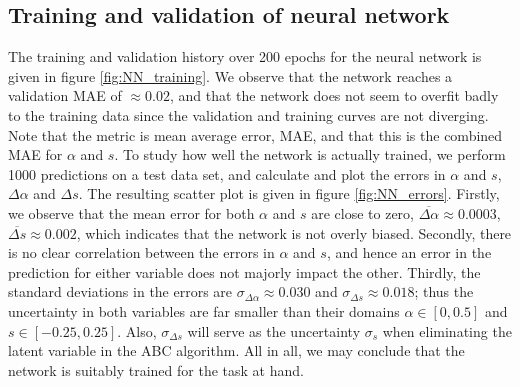 \documentclass[11pt,a4paper]{article}
\begin{document}

\subsection{Training and validation of neural network}\label{sec:validate_NN}

The training and validation history over 200 epochs for the neural network is given in figure \ref{fig:NN_training}. We observe that the network reaches a validation MAE of $\approx 0.02$, and that the network does not seem to overfit badly to the training data since the validation and training curves are not diverging. Note that the metric is mean average error, MAE, and that this is the combined MAE for $\alpha$ and $s$. To study how well the network is actually trained, we perform 1000 predictions on a test data set, and calculate and plot the errors in $\alpha$ and $s$, $\Delta \alpha$ and $\Delta s$. The resulting scatter plot is given in figure \ref{fig:NN_errors}. Firstly, we observe that the mean error for both $\alpha$ and $s$ are close to zero, $\overline{\Delta \alpha} \approx 0.0003$, $\overline{\Delta s} \approx 0.002$, which indicates that the network is not overly biased. Secondly, there is no clear correlation between the errors in $\alpha$ and $s$, and hence an error in the prediction for either variable does not majorly impact the other. Thirdly, the standard deviations in the errors are $\sigma_{\Delta \alpha} \approx 0.030$ and $\sigma_{\Delta s} \approx 0.018$; thus the uncertainty in both variables are far smaller than their domains $\alpha\in[0, 0.5]$ and $s\in[-0.25, 0.25]$. Also, $\sigma_{\Delta s}$ will serve as the uncertainty $\sigma_s$ when eliminating the latent variable in the ABC algorithm. All in all, we may conclude that the network is suitably trained for the task at hand.
\end{document}
